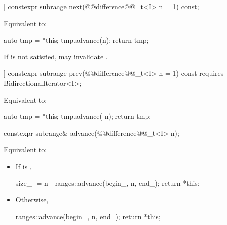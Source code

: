 %
\begin{itemdecl}
[[nodiscard]] constexpr subrange next(@@difference@@_t<I> n = 1) const;
\end{itemdecl}

\begin{itemdescr}
\pnum
\effects Equivalent to:
\begin{codeblock}
auto tmp = *this;
tmp.advance(n);
return tmp;
\end{codeblock}

\pnum
\begin{note}
If  is not satisfied, 
may invalidate .
\end{note}
\end{itemdescr}

%
\begin{itemdecl}
[[nodiscard]] constexpr subrange prev(@@difference@@_t<I> n = 1) const
  requires BidirectionalIterator<I>;
\end{itemdecl}

\begin{itemdescr}
\pnum
\effects Equivalent to:
\begin{codeblock}
auto tmp = *this;
tmp.advance(-n);
return tmp;
\end{codeblock}
\end{itemdescr}

%
\begin{itemdecl}
constexpr subrange& advance(@@difference@@_t<I> n);
\end{itemdecl}

\begin{itemdescr}
\pnum
\effects Equivalent to:
\begin{itemize}
\item If  is ,
\begin{codeblock}
size_ -= n - ranges::advance(begin_, n, end_);
return *this;
\end{codeblock}
\item Otherwise,
\begin{codeblock}
ranges::advance(begin_, n, end_);
return *this;
\end{codeblock}
\end{itemize}
\end{itemdescr}

